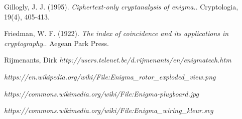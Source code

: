 \documentclass[a4paper,10pt]{article}
\begin{document}
\newpage

\begin{thebibliography}{9}
Gillogly, J. J. (1995). 
\textit{Ciphertext-only cryptanalysis of enigma.}. 
Cryptologia, 19(4), 405-413.

Friedman, W. F. (1922).
\textit{The index of coincidence and its applications in cryptography.}. 
Aegean Park Press.

Rijmenants, Dirk
\textit{http://users.telenet.be/d.rijmenants/en/enigmatech.htm}

\textit{https://en.wikipedia.org/wiki/File:Enigma\_rotor\_exploded\_view.png}

\textit{https://commons.wikimedia.org/wiki/File:Enigma-plugboard.jpg}

\textit{https://commons.wikimedia.org/wiki/File:Enigma\_wiring\_kleur.svg}

\end{thebibliography}
\end{document}
